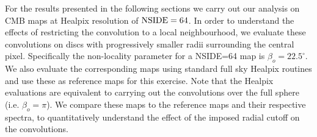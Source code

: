   For the results presented in the following sections we carry out our analysis on CMB maps at Healpix resolution of ${\rm NSIDE}=64$. In order to understand the effects of restricting the convolution to a local neighbourhood, we evaluate these convolutions on discs with progressively smaller radii surrounding the central pixel.  Specifically the non-locality parameter for a NSIDE=64 map is $\beta_o=22.5^{\circ}$. We also evaluate the corresponding maps using standard full sky Healpix routines and use these as reference maps for this exercise. Note that the Healpix evaluations are equivalent to carrying out the convolutions over the full sphere (i.e. $\beta_o=\pi$).  We compare these maps to the reference maps and their respective spectra, to quantitatively understand the effect of the imposed radial cutoff on the convolutions.

